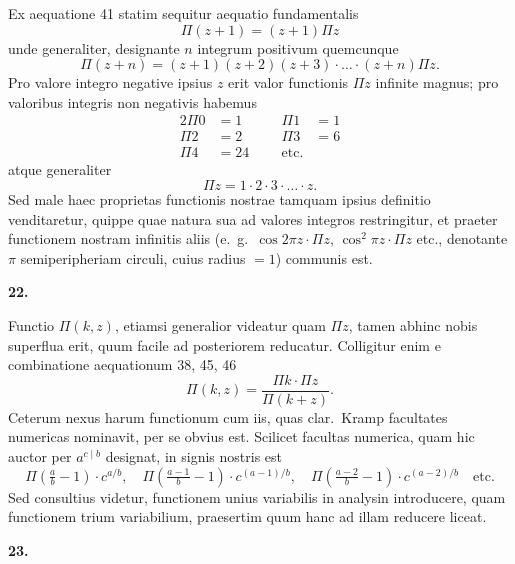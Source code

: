 \documentclass[12pt,a4paper]{article}
\newcommand{\art}[1]{\par\medskip\noindent\textbf{#1.}\par\nopagebreak\smallskip}
\begin{document}
Ex aequatione 41 statim sequitur aequatio fundamentalis
\begin{equation}
\Pi(z+1) = (z+1)\Pi z\tag{[44]}
\end{equation}
unde generaliter, designante $n$ integrum positivum quemcunque
\begin{equation}
\Pi(z+n) = (z+1)(z+2)(z+3)\cdot\ldots\cdot(z+n)\Pi z.\tag{[45]}
\end{equation}
Pro valore integro negative ipsius $z$ erit valor functionis $\Pi z$ infinite magnus; pro valoribus integris non negativis habemus
\begin{alignat*}{2}
\Pi 0 &= 1 \qquad & \Pi 1 &= 1\\
\Pi 2 &= 2 & \Pi 3 &= 6\\
\Pi 4 &= 24 & \text{etc.}
\end{alignat*}
atque generaliter
\begin{equation}
\Pi z = 1\cdot2\cdot3\cdot\ldots\cdot z.\tag{[46]}
\end{equation}
Sed male haec proprietas functionis nostrae tamquam ipsius definitio venditaretur, quippe quae natura sua ad valores integros restringitur, et praeter functionem nostram infinitis aliis (e.\ g.\ $\cos 2\pi z\cdot\Pi z$, $\cos^2\pi z\cdot\Pi z$ etc., denotante $\pi$ semiperipheriam circuli, cuius radius $=1$) communis est.

\art{22}

Functio $\Pi(k,z)$, etiamsi generalior videatur quam $\Pi z$, tamen abhinc nobis superflua erit, quum facile ad posteriorem reducatur. Colligitur enim e combinatione aequationum 38, 45, 46
\begin{equation}
\Pi(k,z) = \frac{\Pi k\cdot\Pi z}{\Pi(k+z)}.\tag{[47]}
\end{equation}
Ceterum nexus harum functionum cum iis, quas clar.\ Kramp facultates numericas nominavit, per se obvius est. Scilicet facultas numerica, quam hic auctor per $a^{c\mid b}$ designat, in signis nostris est
\[
\Pi(\tfrac{a}{b}-1)\cdot c^{a/b},\quad \Pi(\tfrac{a-1}{b}-1)\cdot c^{(a-1)/b},\quad \Pi(\tfrac{a-2}{b}-1)\cdot c^{(a-2)/b} \quad \text{etc.}
\]
Sed consultius videtur, functionem unius variabilis in analysin introducere, quam functionem trium variabilium, praesertim quum hanc ad illam reducere liceat.

\art{23}
\end{document}
